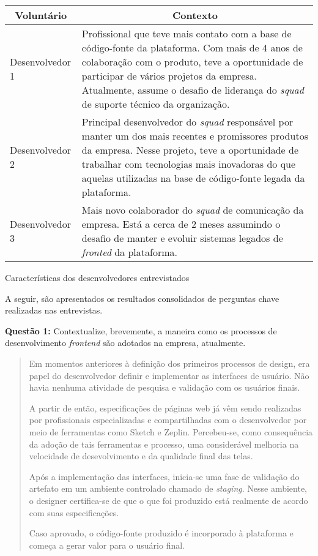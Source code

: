 \begin{quadro}
\centering
\begin{tabular}{|m{4cm}|m{10cm}|} \hline
	
	\multicolumn{1}{|c|}{\bfseries Voluntário} & \multicolumn{1}{c|}{\bfseries Contexto} \\\hline
	
	 Desenvolvedor 1 & Profissional que teve mais contato com a base de código-fonte da plataforma. Com mais de 4 anos de colaboração com o produto, teve a oportunidade de participar de vários projetos da empresa. Atualmente, assume o desafio de liderança do \textit{squad} de suporte técnico da organização. \\\hline
	 
	 Desenvolvedor 2 & Principal desenvolvedor do \textit{squad} responsável por manter um dos mais recentes e promissores produtos da empresa. Nesse projeto, teve a oportunidade de trabalhar com tecnologias mais inovadoras do que aquelas utilizadas na base de código-fonte legada da plataforma. \\\hline
	 
	 Desenvolvedor 3 & Mais novo colaborador do \textit{squad} de comunicação da empresa. Está a cerca de 2 meses assumindo o desafio de manter e evoluir sistemas legados de \textit{fronted} da plataforma. \\\hline
    
\end{tabular}
\caption{Características dos desenvolvedores entrevistados}
\label{table:devsResearch}
\end{quadro}

A seguir, são apresentados os resultados consolidados de perguntas chave realizadas nas entrevistas.

\textbf{Questão 1:} Contextualize, brevemente, a maneira como os processos de desenvolvimento \textit{frontend} são adotados na empresa, atualmente.

\begin{quote}
    Em momentos anteriores à definição dos primeiros processos de design, era papel do desenvolvedor definir e implementar as interfaces de usuário. Não havia nenhuma atividade de pesquisa e validação com os usuários finais.
    
    A partir de então, especificações de páginas web já vêm sendo realizadas por profissionais especializadas e compartilhadas com o desenvolvedor por meio de ferramentas como Sketch e Zeplin. Percebeu-se, como consequência da adoção de tais ferramentas e processo, uma considerável melhoria na velocidade de desevolvimento e da qualidade final das telas.
    
    Após a implementação das interfaces, inicia-se uma fase de validação do artefato em um ambiente controlado chamado de \textit{staging}. Nesse ambiente, o designer certifica-se de que o que foi produzido está realmente de acordo com suas especificações.
    
    Caso aprovado, o código-fonte produzido é incorporado à plataforma e começa a gerar valor para o usuário final.
\end{quote}

